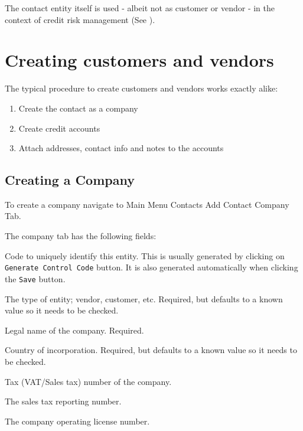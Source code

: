 The contact entity itself is used - albeit not as customer or vendor - in the context of
credit risk management (See ).

\section{Creating customers and vendors}
\label{sec-workflows-creating-customers-and-vendors}

The typical procedure to create customers and vendors works exactly alike:

\begin{enumerate}
\item Create the \gls{contact} as a company
\item Create \glspl{credit account}
\item Attach addresses, contact info and notes to the accounts
\end{enumerate}

\subsection{Creating a Company}
\label{subsec-worflows-customer-creating-company}

To create a company navigate to Main Menu \ma Contacts \ma Add Contact \ma Company Tab.

The company tab has the following fields:

\begin{description}[style=nextline]
\item [Control code] Code to uniquely identify this entity.  This is usually generated by clicking on \texttt{Generate Control Code} button.  It is also generated automatically when clicking the \texttt{Save} button.
\item [Class] The type of entity; \gls{vendor}, \gls{customer}, etc. Required, but defaults to a known value so it needs to be checked.
\item [Name] Legal name of the company. Required.
\item [Country] Country of incorporation. Required, but defaults to a known value so it needs to be checked.
\item [Tax number/SSN] Tax (VAT/Sales tax) number of the company.
\item [Sales Tax ID] The sales tax reporting number.
\item [License Number] The company operating license number.
\end{description}

